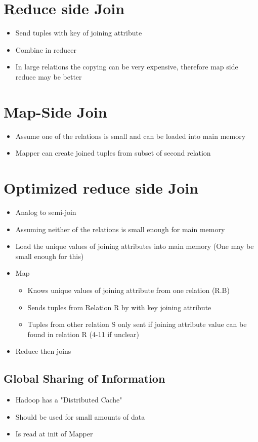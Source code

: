 \documentclass[10pt,a4paper]{scrreprt}
\begin{document}
\section{Reduce side Join}
\begin{itemize}
	\item Send tuples with key of joining attribute
	\item Combine in reducer
	\item In large relations the copying can be very expensive, therefore map side reduce may be better
\end{itemize}

\section{Map-Side Join}
\begin{itemize}
	\item Assume one of the relations is small and can be loaded into main memory
	\item Mapper can create joined tuples from subset of second relation
\end{itemize}

\section{Optimized reduce side Join}
\begin{itemize}
	\item Analog to semi-join
	\item Assuming neither of the relations is small enough for main memory
	\item Load the unique values of joining attributes into main memory (One may be small enough for this)
	\item Map
	\begin{itemize}
		\item Knows unique values of joining attribute from one relation (R.B)
		\item Sends tuples from Relation R by with key joining attribute
		\item Tuples from other relation S only sent if joining attribute value can be found in relation R (4-11 if unclear)
	\end{itemize}
	\item Reduce then joins
\end{itemize}

\subsection{Global Sharing of Information}
\begin{itemize}
	\item Hadoop has a "Distributed Cache"
	\item Should be used for small amounts of data
	\item Is read at init of Mapper
\end{itemize}
\end{document}
